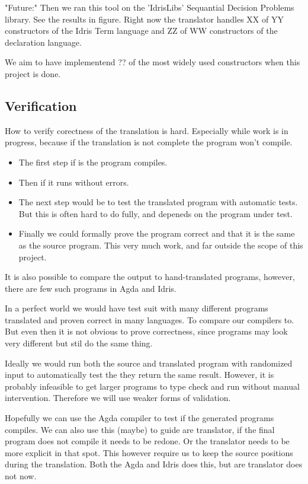 \documentclass[parskip=half]{scrartcl}
\begin{document}
"Future:" Then we ran this tool on the 'IdrisLibs' Sequantial Decision
Problems library. See the results in figure. Right now the translator handles
XX of YY constructors of the Idris Term language and ZZ of WW constructors of
the declaration language.

We aim to have implementend ?? of the most widely used constructors when this
project is done.


\subsection{Verification}
How to verify corectness of the translation is hard. Especially while work is
in progress, because if the translation is not complete the program won't
compile.

\begin{itemize}
\item The first step if is the program compiles.
\item Then if it runs without errors.
\item The next step would be to test the translated program with automatic tests.
  But this is often hard to do fully, and depeneds on the program under test.
\item Finally we could formally prove the program correct and that it is the same
  as the source program. This very much work, and far outside the scope of this
  project.
\end{itemize}

It is also possible to compare the output to hand-translated programs, however,
there are few such programs in Agda and Idris.

In a perfect world we would have test suit with many different programs
translated and proven correct in many languages. To compare our compilers to.
But even then it is not obvious to prove correctness, since programs may look
very different but stil do the same thing.

Ideally we would run both the source and translated program with randomized
input to automatically test the they return the same result. However, it is
probably infeasible to get larger programs to type check and run without manual
intervention.  Therefore we will use weaker forms of validation.

Hopefully we can use the Agda compiler to test if the generated programs
compiles. We can also use this (maybe) to guide are translator, if the final
program does not compile it needs to be redone. Or the translator needs to be
more explicit in that spot. This however require us to keep the source
positions during the translation. Both the Agda and Idris does this, but are
translator does not now.
\end{document}
